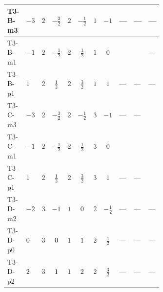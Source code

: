 \documentclass[8pt]{article}
\begin{document}
\begin{landscape}
\begin{longtable}{@{}llcccccc >{\raggedright\arraybackslash}p{0.21\linewidth} >{\raggedright\arraybackslash}p{0.21\linewidth} >{\raggedright\arraybackslash}p{0.21\linewidth}@{}}
\midrule
T3-B-m3 & $-3$ & $2$ & $-\frac{3}{2}$ & $2$ & $-\frac{1}{2}$ & $1$ & $-1$ & --- & --- & --- \\
\midrule
T3-B-m1 & $-1$ & $2$ & $-\frac{1}{2}$ & $2$ & $\frac{1}{2}$ & $1$ & $0$ & \scriptsize\adjustbox{max width=\linewidth}{$\begin{gathered} +\frac{64}{3} {\lambda_{9}} \left({\lambda_{9}}\right)^{*}\end{gathered}$} & \scriptsize\adjustbox{max width=\linewidth}{$\begin{gathered} +{g_1}^2 \left(-6 {g_2}^2-3 {\lambda_{12}^{(A)}}\right)\end{gathered}$} & --- \\
\midrule
T3-B-p1 & $1$ & $2$ & $\frac{1}{2}$ & $2$ & $\frac{3}{2}$ & $1$ & $1$ & --- & --- & --- \\
\midrule
T3-C-m3 & $-3$ & $2$ & $-\frac{3}{2}$ & $2$ & $-\frac{1}{2}$ & $3$ & $-1$ & --- & --- & \scriptsize\adjustbox{max width=\linewidth}{$\begin{gathered} {\lambda_{12}^{(A)}} (3 T_{\nu}^{(1)}+3 T_{\nu}^{(2)})\end{gathered}$} \\
\midrule
T3-C-m1 & $-1$ & $2$ & $-\frac{1}{2}$ & $2$ & $\frac{1}{2}$ & $3$ & $0$ & \scriptsize\adjustbox{max width=\linewidth}{$\begin{gathered} +\frac{64}{3} {\lambda_{9}} \left({\lambda_{9}}\right)^{*}\end{gathered}$} & \scriptsize\adjustbox{max width=\linewidth}{$\begin{gathered} +{g_1}^2 \left(-6 {g_2}^2-3 {\lambda_{12}^{(A)}}\right)\end{gathered}$} & \scriptsize\adjustbox{max width=\linewidth}{$\begin{gathered} {\lambda_{12}^{(A)}} (3 T_{\nu}^{(1)}+3 T_{\nu}^{(2)})\end{gathered}$} \\
\midrule
T3-C-p1 & $1$ & $2$ & $\frac{1}{2}$ & $2$ & $\frac{3}{2}$ & $3$ & $1$ & --- & --- & \scriptsize\adjustbox{max width=\linewidth}{$\begin{gathered} {\lambda_{12}^{(A)}} (3 T_{\nu}^{(1)}+3 T_{\nu}^{(2)})\end{gathered}$} \\
\midrule
T3-D-m2 & $-2$ & $3$ & $-1$ & $1$ & $0$ & $2$ & $-\frac{1}{2}$ & --- & --- & --- \\
\midrule
T3-D-p0 & $0$ & $3$ & $0$ & $1$ & $1$ & $2$ & $\frac{1}{2}$ & --- & --- & --- \\
\midrule
T3-D-p2 & $2$ & $3$ & $1$ & $1$ & $2$ & $2$ & $\frac{3}{2}$ & --- & --- & --- \\

\end{longtable}
\end{landscape}
\end{document}
